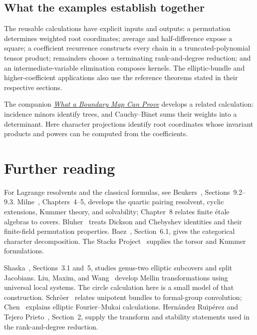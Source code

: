 \documentclass[11pt]{article}
\theoremstyle{remark}
\begin{document}
\subsection{What the examples establish together}

The reusable calculations have explicit inputs and outputs: a permutation determines weighted root coordinates; average and half-difference expose a square; a coefficient recurrence constructs every chain in a truncated-polynomial tensor product; remainders choose a terminating rank-and-degree reduction; and an intermediate-variable elimination composes kernels. The elliptic-bundle and higher-coefficient applications also use the reference theorems stated in their respective sections.

The companion \href{https://refactor.press/notes/what-a-boundary-map-can-prove}{\emph{What a Boundary Map Can Prove}} develops a related calculation: incidence minors identify trees, and Cauchy--Binet sums their weights into a determinant. Here character projections identify root coordinates whose invariant products and powers can be computed from the coefficients.

\section*{Further reading}

For Lagrange resolvents and the classical formulas, see Beukers~\cite{beukers}, Sections~9.2--9.3. Milne~\cite{milne}, Chapters~4--5, develops the quartic pairing resolvent, cyclic extensions, Kummer theory, and solvability; Chapter~8 relates finite \'etale algebras to covers. Bluher~\cite{bluher} treats Dickson and Chebyshev identities and their finite-field permutation properties. Baez~\cite{baez}, Section~6.1, gives the categorical character decomposition. The Stacks Project~\cite{stacks-kummer,stacks-torsors} supplies the torsor and Kummer formulations.

Shaska~\cite{shaska-split}, Sections~3.1 and~5, studies genus-two elliptic subcovers and split Jacobians. Liu, Maxim, and Wang~\cite{liu-maxim-wang-mellin} develop Mellin transformations using universal local systems. The circle calculation here is a small model of that construction. Schr\"oer~\cite{schroer} relates unipotent bundles to formal-group convolution; Chen~\cite{chen} explains elliptic Fourier--Mukai calculations. Hern\'andez Ruip\'erez and Tejero Prieto~\cite{ruiperez-tejero}, Section~2, supply the transform and stability statements used in the rank-and-degree reduction.
\end{document}
